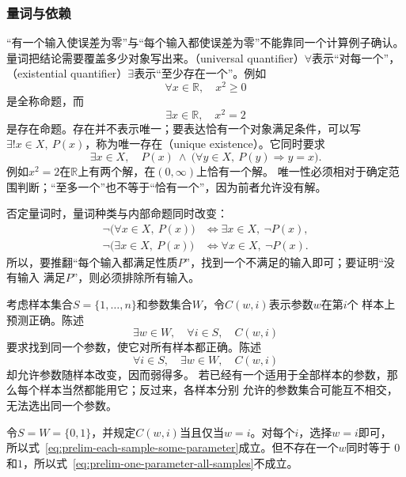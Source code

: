 \subsubsection{量词与依赖}
\label{sec:prelim-quantifier-dependence}

“有一个输入使误差为零”与“每个输入都使误差为零”不能靠同一个计算例子确认。
量词把结论需要覆盖多少对象写出来。（universal quantifier）$\forall$表示“对每一个”，
（existential quantifier）$\exists$表示“至少存在一个”。例如
\[
  \forall x\in\mathbb{R},\quad x^2\geq0
\]
是全称命题，而
\[
  \exists x\in\mathbb{R},\quad x^2=2
\]
是存在命题。存在并不表示唯一；要表达恰有一个对象满足条件，可以写
$\exists!x\in X,\ P(x)$，称为唯一存在（unique existence）。它同时要求
\[
  \exists x\in X,\quad
  P(x)\ \land\
  \bigl(\forall y\in X,\ P(y)\Rightarrow y=x\bigr).
\]
例如$x^2=2$在$\mathbb{R}$上有两个解，在$(0,\infty)$上恰有一个解。
唯一性必须相对于确定范围判断；“至多一个”也不等于“恰有一个”，因为前者允许没有解。

否定量词时，量词种类与内部命题同时改变：
\begin{align*}
  \neg\bigl(\forall x\in X,\ P(x)\bigr)
  &\Longleftrightarrow
  \exists x\in X,\ \neg P(x),\\
  \neg\bigl(\exists x\in X,\ P(x)\bigr)
  &\Longleftrightarrow
  \forall x\in X,\ \neg P(x).
\end{align*}
所以，要推翻“每个输入都满足性质$P$”，找到一个不满足的输入即可；要证明“没有输入
满足$P$”，则必须排除所有输入。

考虑样本集合$S=\{1,\ldots,n\}$和参数集合$W$，令$C(w,i)$表示参数$w$在第$i$个
样本上预测正确。陈述
\begin{equation}
  \exists w\in W,\quad \forall i\in S,\quad C(w,i)
  \label{eq:prelim-one-parameter-all-samples}
\end{equation}
要求找到同一个参数，使它对所有样本都正确。陈述
\begin{equation}
  \forall i\in S,\quad \exists w\in W,\quad C(w,i)
  \label{eq:prelim-each-sample-some-parameter}
\end{equation}
却允许参数随样本改变，因而弱得多。
若已经有一个适用于全部样本的参数，那么每个样本当然都能用它；反过来，各样本分别
允许的参数集合可能互不相交，无法选出同一个参数。

\begin{example}[逐点可选不等于统一可选]
\label{ex:prelim-quantifier-order}
令$S=W=\{0,1\}$，并规定$C(w,i)$当且仅当$w=i$。对每个$i$，选择$w=i$即可，
所以式~\eqref{eq:prelim-each-sample-some-parameter}成立。但不存在一个$w$同时等于
$0$和$1$，所以式~\eqref{eq:prelim-one-parameter-all-samples}不成立。
\end{example}

